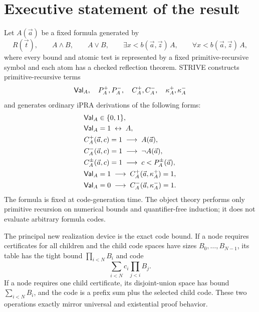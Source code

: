 \section*{Executive statement of the result}

Let \(A(\vec a)\) be a fixed formula generated by
\[
  R(\vec t),\qquad A\wedge B,\qquad A\vee B,
  \qquad \exists x<b(\vec a,\vec z)\,A,
  \qquad \forall x<b(\vec a,\vec z)\,A,
\]
where every bound and atomic test is represented by a fixed
primitive-recursive symbol and each atom has a checked reflection theorem.
STRIVE constructs primitive-recursive terms
\[
 \mathsf{Val}_A,\quad P_A^+,P_A^-,\quad C_A^+,C_A^-,
 \quad \kappa_A^+,\kappa_A^-
\]
and generates ordinary iPRA derivations of the following forms:
\begin{align*}
 &\mathsf{Val}_A\in\{0,1\},\\
 &\mathsf{Val}_A=1\;\leftrightarrow\;A,\\
 &C_A^+(\vec a,c)=1\;\longrightarrow\;A(\vec a),\\
 &C_A^-(\vec a,c)=1\;\longrightarrow\;\neg A(\vec a),\\
 &C_A^\pm(\vec a,c)=1\;\longrightarrow\;c<P_A^\pm(\vec a),\\
 &\mathsf{Val}_A=1\;\longrightarrow\;C_A^+(\vec a,\kappa_A^+)=1,\\
 &\mathsf{Val}_A=0\;\longrightarrow\;C_A^-(\vec a,\kappa_A^-)=1.
\end{align*}
The formula is fixed at code-generation time.  The object theory performs only
primitive recursion on numerical bounds and quantifier-free induction; it does
not evaluate arbitrary formula codes.

The principal new realization device is the exact code bound.  If a node
requires certificates for all children and the child code spaces have sizes
\(B_0,\ldots,B_{N-1}\), its table has the tight bound
\(\prod_{i<N}B_i\) and code
\[
  \sum_{i<N} c_i\prod_{j<i}B_j.
\]
If a node requires one child certificate, its disjoint-union space has bound
\(\sum_{i<N}B_i\), and the code is a prefix sum plus the selected child code.
These two operations exactly mirror universal and existential proof behavior.
